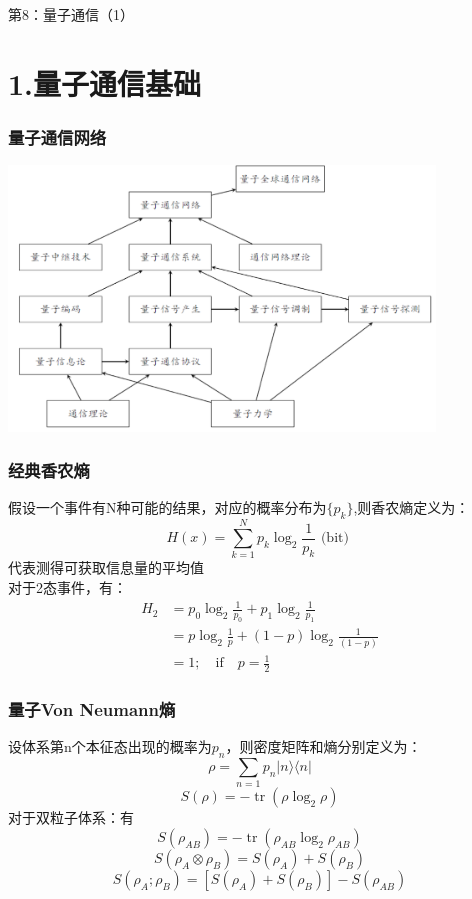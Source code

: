 

\begin{frame} [plain]
    \frametitle{}
    \Background[1] 
    \begin{center}
    {\huge 第8：量子通信（1）    }
    \end{center}  
    \addtocounter{framenumber}{-1}   
\end{frame}

\section{1.量子通信基础}
\begin{frame}
    \frametitle{量子通信网络}
    \begin{center}
        \includegraphics[width=0.85\textwidth]{figs/40.png}
    \end{center}
\end{frame}

\begin{frame}
    \frametitle{经典香农熵}
    假设一个事件有N种可能的结果，对应的概率分布为$\{p_k\}$,则香农熵定义为：
    \[H(x)=\sum_{k=1}^{N} p_{k} \log _{2} \frac{1}{p_{k}} \text { (bit) }\]
    代表测得可获取信息量的平均值\\
    对于2态事件，有：
    \[\begin{aligned} H_{2} &=p_{0} \log _{2} \frac{1}{p_{0}}+p_{1} \log _{2} \frac{1}{p_{1}} \\ 
        &=p \log _{2} \frac{1}{p}+(1-p) \log _{2} \frac{1}{(1-p)} \\
        &=1; \quad \text{if} \quad p=\frac{1}{2}
     \end{aligned}\]   
\end{frame}

\begin{frame}
    \frametitle{量子Von Neumann熵}
    设体系第n个本征态出现的概率为$p_n$，则密度矩阵和熵分别定义为：
    \[\rho=\sum_{n=1} p_{n}|n\rangle\langle n| \]
    \[S(\rho)=-\operatorname{tr}\left(\rho \log _{2} \rho\right)\]
    对于双粒子体系：有
    \[S\left(\rho_{A B}\right)=-\operatorname{tr}\left(\rho_{A B} \log _{2} \rho_{A B}\right)\]
    \[S\left(\rho_{A} \otimes \rho_{B}\right)=S\left(\rho_{A}\right)+S\left(\rho_{B}\right)\]
    \[S\left(\rho_{A} ; \rho_{B}\right)=\left[S\left(\rho_{A}\right)+S\left(\rho_{B}\right)\right]-S\left(\rho_{A B}\right)\]
\end{frame}

